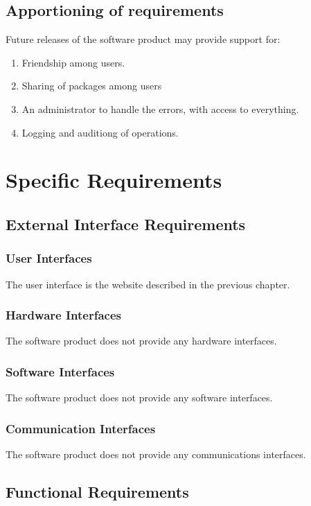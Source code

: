 \documentclass[a4paper,12pt]{book}
\begin{document}
\section{Apportioning of requirements}
Future releases of the software product may provide support for:
\begin{enumerate}[noitemsep]
  \item Friendship among users.
  \item Sharing of packages among users
  \item An administrator to handle the errors, with access to everything.
  \item Logging and auditiong of operations.
\end{enumerate}

\chapter{Specific Requirements}

\section{External Interface Requirements}

\subsection{User Interfaces}
The user interface is the website described in the previous chapter.

\subsection{Hardware Interfaces}
The software product does not provide any hardware interfaces.

\subsection{Software Interfaces}
The software product does not provide any software interfaces.

\subsection{Communication Interfaces}
The software product does not provide any communications interfaces.

\section{Functional Requirements}
\end{document}
